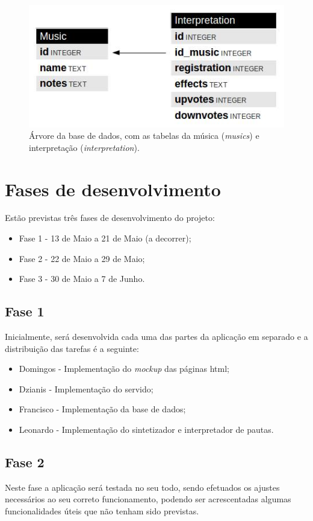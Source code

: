 \documentclass{report}
\begin{document}
\begin{figure}[htp]
\centering
\includegraphics[width=\textwidth]{images/tree.jpg}
\caption{Árvore da base de dados, com as tabelas da música (\emph{musics}) e interpretação (\emph{interpretation}).}
\label{tree}
\end{figure}

\chapter{Fases de desenvolvimento}
\label{chap.fases}
Estão previstas três fases de desenvolvimento do projeto:

\begin{itemize}
\item Fase 1 - 13 de Maio a 21 de Maio (a decorrer);
\item Fase 2 - 22 de Maio a 29 de Maio;
\item Fase 3 - 30 de Maio a 7 de Junho.
\end{itemize}

\section{Fase 1}
Inicialmente, será desenvolvida cada uma das partes da aplicação em separado e a distribuição das tarefas é a seguinte:
\begin{itemize}
\item Domingos - Implementação do \textit{mockup} das páginas \ac{html};
\item Dzianis - Implementação do servido;
\item Francisco - Implementação da base de dados;
\item Leonardo - Implementação do sintetizador e interpretador de pautas.
\end{itemize}
\section{Fase 2}
Neste fase a aplicação será testada no seu todo, sendo efetuados os ajustes necessários ao seu correto funcionamento, podendo ser acrescentadas algumas funcionalidades úteis que não tenham sido previstas.
\end{document}

